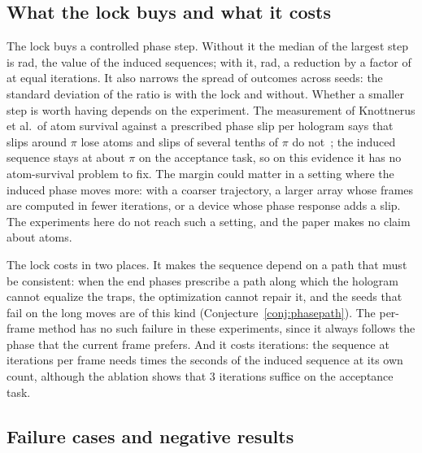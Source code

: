 \subsection{What the lock buys and what it costs}

The lock buys a controlled phase step. Without it the median of the largest step is \ablTNoLockStep{} rad, the value of the induced sequences; with it, \ablTFullStep{} rad, a reduction by a factor of \lockStepRatio{} at equal iterations. It also narrows the spread of outcomes across seeds: the standard deviation of the ratio is \ablTFullSd{} with the lock and \ablTNoLockSd{} without. Whether a smaller step is worth having depends on the experiment. The measurement of Knottnerus et al.\ of atom survival against a prescribed phase slip per hologram says that slips around $\pi$ lose atoms and slips of several tenths of $\pi$ do not~\cite{lpi}; the induced sequence stays at about $\pi$ on the acceptance task, so on this evidence it has no atom-survival problem to fix. The margin could matter in a setting where the induced phase moves more: with a coarser trajectory, a larger array whose frames are computed in fewer iterations, or a device whose phase response adds a slip. The experiments here do not reach such a setting, and the paper makes no claim about atoms.

The lock costs in two places. It makes the sequence depend on a path that must be consistent: when the end phases prescribe a path along which the hologram cannot equalize the traps, the optimization cannot repair it, and the seeds that fail on the long moves are of this kind (Conjecture~\ref{conj:phasepath}). The per-frame method has no such failure in these experiments, since it always follows the phase that the current frame prefers. And it costs iterations: the sequence at \parFrameIters{} iterations per frame needs \secRatio{} times the seconds of the induced sequence at its own count, although the ablation shows that 3 iterations suffice on the acceptance task.

\subsection{Failure cases and negative results}

